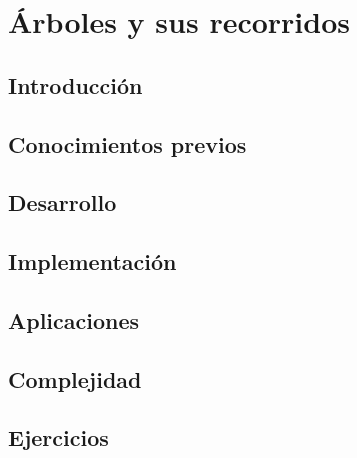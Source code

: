 \chapter{Árboles y sus recorridos}
\section{Introducción}

\section{Conocimientos previos}

\section{Desarrollo}

\section{Implementación}

\section{Aplicaciones}

\section{Complejidad}

\section{Ejercicios}
